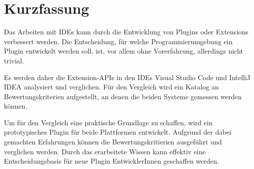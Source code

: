 \chapter{Kurzfassung}

Das Arbeiten mit IDEs kann durch die Entwicklung von 
Plugins oder Extensions verbessert werden. Die Entscheidung,
für welche Programmierumgebung ein Plugin entwickelt werden soll,
ist, vor allem ohne Vorerfahrung, allerdings nicht trivial.

Es werden daher die Extension-APIs in den IDEs Visual Studio Code
und IntelliJ IDEA analysiert und verglichen. Für den Vergleich
wird ein Katalog an Bewertungskriterien aufgestellt, an denen die
beiden Systeme gemessen werden können.

Um für den Vergleich eine praktische Grundlage zu schaffen, wird
ein prototypisches Plugin für beide Plattformen entwickelt. Aufgrund
der dabei gemachten Erfahrungen können die Bewertungskritierien
ausgeführt und verglichen werden. Durch das erarbeitete Wissen
kann effektiv eine Entscheidungsbasis für neue Plugin EntwicklerInnen
geschaffen werden.